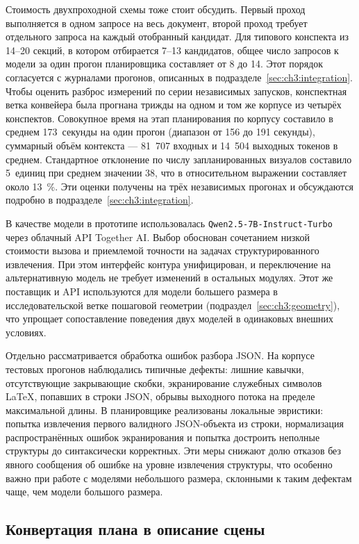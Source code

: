Стоимость двухпроходной схемы тоже стоит обсудить. Первый проход выполняется в одном запросе на весь документ, второй проход требует отдельного запроса на каждый отобранный кандидат. Для типового конспекта из 14--20 секций, в котором отбирается 7--13 кандидатов, общее число запросов к модели за один прогон планировщика составляет от 8 до 14. Этот порядок согласуется с журналами прогонов, описанных в подразделе~\ref{sec:ch3:integration}. Чтобы оценить разброс измерений по серии независимых запусков, конспектная ветка конвейера была прогнана трижды на одном и том же корпусе из четырёх конспектов. Совокупное время на этап планирования по корпусу составило в среднем 173~секунды на один прогон (диапазон от 156 до 191 секунды), суммарный объём контекста --- 81~707 входных и 14~504 выходных токенов в среднем. Стандартное отклонение по числу запланированных визуалов составило 5~единиц при среднем значении 38, что в относительном выражении составляет около 13~\%. Эти оценки получены на трёх независимых прогонах и обсуждаются подробно в подразделе~\ref{sec:ch3:integration}.

В качестве модели в прототипе использовалась \texttt{Qwen2.5\nobreakdash-7B\nobreakdash-Instruct\nobreakdash-Turbo} через облачный API Together AI. Выбор обоснован сочетанием низкой стоимости вызова и приемлемой точности на задачах структурированного извлечения. При этом интерфейс контура унифицирован, и переключение на альтернативную модель не требует изменений в остальных модулях. Этот же поставщик и API используются для модели большего размера в исследовательской ветке пошаговой геометрии (подраздел~\ref{sec:ch3:geometry}), что упрощает сопоставление поведения двух моделей в одинаковых внешних условиях.

Отдельно рассматривается обработка ошибок разбора JSON. На корпусе тестовых прогонов наблюдались типичные дефекты: лишние кавычки, отсутствующие закрывающие скобки, экранирование служебных символов LaTeX, попавших в строки JSON, обрывы выходного потока на пределе максимальной длины. В планировщике реализованы локальные эвристики: попытка извлечения первого валидного JSON\nobreakdash-объекта из строки, нормализация распространённых ошибок экранирования и попытка достроить неполные структуры до синтаксически корректных. Эти меры снижают долю отказов без явного сообщения об ошибке на уровне извлечения структуры, что особенно важно при работе с моделями небольшого размера, склонными к таким дефектам чаще, чем модели большого размера.

\subsection{Конвертация плана в описание сцены}
\label{sec:ch3:converter}

